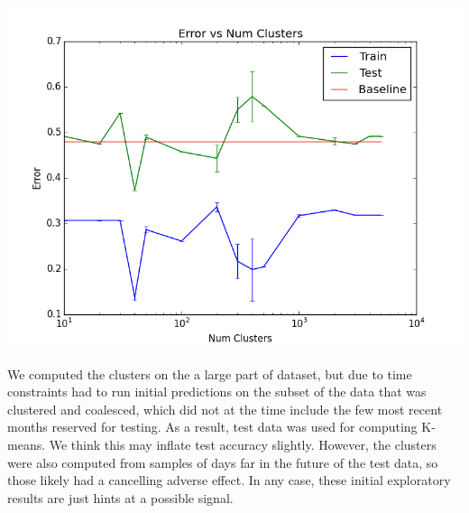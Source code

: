 \includegraphics{images/error_v_k.png}

We computed the clusters on the a large part of dataset, but due to time constraints had to run initial predictions on the subset of the data that was clustered and coalesced, which did not at the time include the few most recent months reserved for testing. As a result, test data was used for computing K-means. We think this may inflate test accuracy slightly. However, the clusters were also computed from samples of days far in the future of the test data, so those likely had a cancelling adverse effect. In any case, these initial exploratory results are just hints at a possible signal.